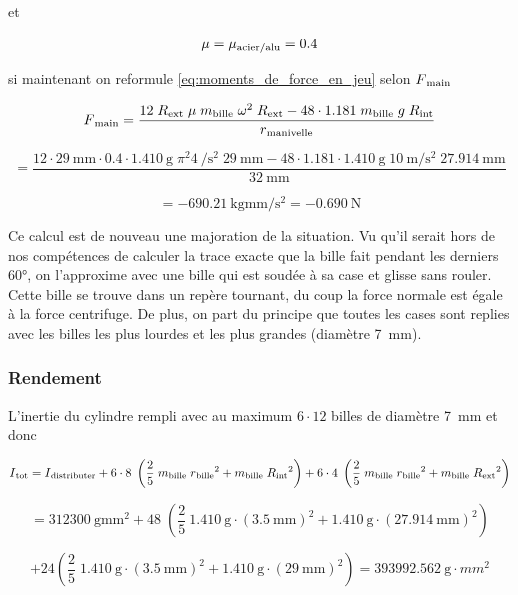 et

\[\mu = \mu\textsubscript{acier/alu} = \num{0.4}\]

si maintenant on reformule \ref{eq:moments_de_force_en_jeu} selon $F\textsubscript{main}$

\[F\textsubscript{main} = \frac{12 \; R\textsubscript{ext} \; \mu \; m\textsubscript{bille} \; \omega^{2} \; R\textsubscript{ext} - 48 \cdot \num{1.181} \; m\textsubscript{bille} \; g \; R\textsubscript{int}}{r\textsubscript{manivelle}}\]

\[= \frac{12 \cdot \SI{29}{\milli\metre} \cdot \num{0.4} \cdot \SI{1.410}{\g} \; \pi^{2}\SI{4}{\per\s\squared}\; \SI{29}{\milli\metre} - 48 \cdot \num{1.181}\cdot \SI{1.410}{\g} \; \SI{10}{\m\per\s\squared} \; \SI{27.914}{\milli\metre}}{\SI{32}{\milli\metre}}\]

\begin{equation}
    = \SI{-690.21}{\kg\mm\per\s\squared} = \SI{-0.690}{\N}
    \label{eq:F_main}
\end{equation}

Ce calcul est de nouveau une majoration de la situation. Vu qu'il serait hors de nos compétences de calculer la trace exacte que la bille fait pendant les derniers \ang{60}, on l'approxime avec une bille qui est soudée à sa case et glisse sans rouler. Cette bille se trouve dans un repère tournant, du coup la force normale est égale à la force centrifuge. De plus, on part du principe que toutes les cases sont replies avec les billes les plus lourdes et les plus grandes (diamètre \SI{7}{\milli\metre}).

\subsubsection{Rendement}
L'inertie du cylindre rempli avec au maximum $6 \cdot 12$ billes de diamètre \SI{7}{\milli\metre} et donc

    \[I\textsubscript{tot} = I\textsubscript{distributer} + 6\cdot8 \; \left(\frac{2}{5} \; m\textsubscript{bille} \; r\textsubscript{bille}^{2} + m\textsubscript{bille} \; R\textsubscript{int}^2 \right) + 6\cdot4 \; \left(\frac{2}{5} \; m\textsubscript{bille} \; r\textsubscript{bille}^{2} + m\textsubscript{bille} \; R\textsubscript{ext}^2\right)\]
    
    \[= \SI{312300}{\g\mm\squared} + 48\; \left(\frac{2}{5}\ \SI{1.410}{\g}\cdot (\SI{3.5}{\milli\metre})^{2} + \SI{1.410}{\g}\cdot (\SI{27.914}{\milli\metre})^2\right)\]
    
    \[+ 24 \left(\frac{2}{5} \; \SI{1.410}{\g}\cdot (\SI{3.5}{\milli\metre})^2 + \SI{1.410}{\g}\cdot (\SI{29}{\milli\metre})^2\right) = \SI{393992.562}{\g\cdot mm^2}\]
    

